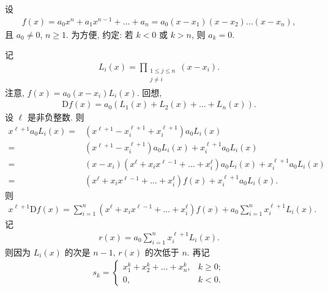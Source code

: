 \documentclass[../libro.tex]{subfiles}
\begin{document}
\begin{example}
    设
    \begin{align*}
        f(x) = a_0 x^n + a_1 x^{n-1} + \dots + a_n
        = a_0 (x - x_1) (x - x_2) \dots (x - x_n),
    \end{align*}
    且 \(a_0 \neq 0\), \(n \geq 1\).
    为方便, 约定:
    若 \(k < 0\) 或 \(k > n\), 则 \(a_k = 0\).

    记
    \begin{align*}
        L_i (x) =
        \prod_{\substack{1 \leq j \leq n \\ j \neq i}}
        {(x - x_i)}.
    \end{align*}
    注意, \(f(x) = a_0 (x - x_i) L_i (x)\).
    回想,
    \begin{align*}
        \mathrm{D} f(x) =
        a_0 (L_1 (x) + L_2 (x) + \dots + L_n (x)).
    \end{align*}
    设 \(\ell\) 是非负整数.
    则
    \begin{align*}
        x^{\ell+1} a_0 L_i (x)
        = {} &
        (x^{\ell+1} - x_i^{\ell+1} + x_i^{\ell+1})
        a_0 L_i (x)
        \\
        = {} &
        (x^{\ell+1} - x_i^{\ell+1}) a_0 L_i (x)
        + x_i^{\ell+1} a_0 L_i (x)
        \\
        = {} &
        (x - x_i)
        (x^\ell + x_i x^{\ell-1} + \dots + x_i^\ell)
        a_0 L_i (x)
        + x_i^{\ell+1} a_0 L_i (x)
        \\
        = {} &
        (x^\ell + x_i x^{\ell-1} + \dots + x_i^\ell) f(x)
        + x_i^{\ell+1} a_0 L_i (x).
    \end{align*}
    则
    \begin{align*}
        x^{\ell+1} \mathrm{D} f(x)
        = \sum_{i = 1}^{n}
        {(x^\ell + x_i x^{\ell-1} + \dots + x_i^\ell)} f(x)
        + a_0 \sum_{i = 1}^{n} {x_i^{\ell+1} L_i (x)}.
    \end{align*}
    记
    \begin{align*}
        r(x) = a_0 \sum_{i = 1}^{n} {x_i^{\ell+1} L_i (x)}.
    \end{align*}
    则因为 \(L_i (x)\) 的次是 \(n-1\),
    \(r(x)\) 的次低于 \(n\).
    再记
    \begin{align*}
        s_k =
        \begin{cases}
            x_1^k + x_2^k + \dots + x_n^k, & k \geq 0; \\
            0,                             & k < 0.
        \end{cases}

\end{align*}
\end{example}
\end{document}
